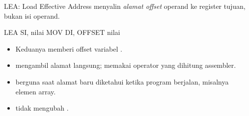 \documentclass[aspectratio=169,11pt]{beamer}
\begin{document}

\begin{frame}[fragile]{LEA: Load Effective Address}
\small
{} menyalin \emph{alamat offset} operand ke register
tujuan, bukan isi operand.

\vspace{0.2em}
\begin{kodeasm}[numbers=none]
LEA SI, nilai
MOV DI, OFFSET nilai
\end{kodeasm}

\vspace{0.15em}
\begin{itemize}
    \item Keduanya memberi offset variabel .
    \item {} mengambil alamat langsung;  memakai
          operator  yang dihitung assembler.
    \item {} berguna saat alamat baru diketahui ketika
          program berjalan, misalnya elemen array.
    \item {} tidak mengubah .
\end{itemize}
\end{frame}
\end{document}
